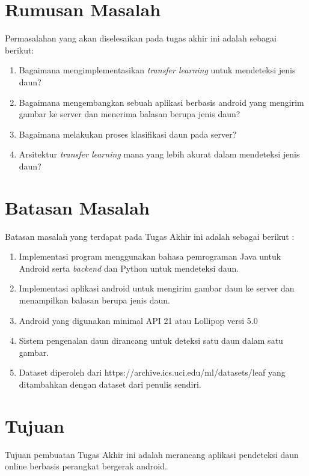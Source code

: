 \section {Rumusan Masalah}

Permasalahan yang akan diselesaikan pada tugas akhir ini adalah sebagai berikut:

\begin {enumerate}
\item Bagaimana mengimplementasikan \textit{transfer learning} untuk mendeteksi jenis daun? 
\item Bagaimana mengembangkan sebuah aplikasi berbasis android yang mengirim gambar ke server dan menerima balasan berupa jenis daun?
\item Bagaimana melakukan proses klasifikasi daun pada server?
\item Arsitektur \textit{transfer learning} mana yang lebih akurat dalam mendeteksi jenis daun? 
\end {enumerate}

\section {Batasan Masalah}

Batasan masalah yang terdapat pada Tugas Akhir ini adalah sebagai berikut : 
\begin {enumerate}
\item Implementasi program menggunakan bahasa pemrograman Java untuk Android serta \textit{backend} dan Python untuk mendeteksi daun. 
\item Implementasi aplikasi android untuk mengirim gambar daun ke server dan menampilkan balasan berupa jenis daun.
\item Android yang digunakan minimal API 21 atau Lollipop versi 5.0
\item Sistem pengenalan daun dirancang untuk deteksi satu daun dalam satu gambar. 
\item Dataset diperoleh dari https://archive.ics.uci.edu/ml/datasets/leaf yang ditambahkan dengan dataset dari penulis sendiri. 
\end {enumerate}

\section {Tujuan}

Tujuan pembuatan Tugas Akhir ini adalah merancang aplikasi pendeteksi daun online berbasis perangkat bergerak android. 

